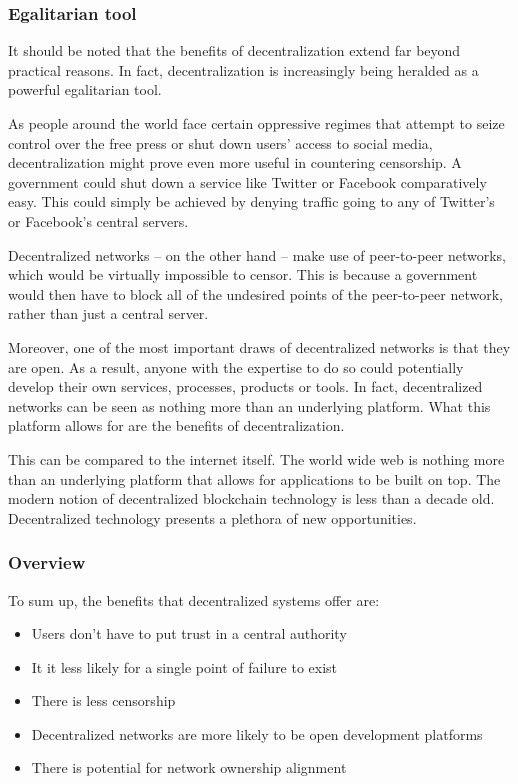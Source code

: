 \subsubsection{Egalitarian tool}
It should be noted that the benefits of decentralization extend far beyond practical reasons. In fact, decentralization is increasingly being heralded as a powerful egalitarian tool.

As people around the world face certain oppressive regimes that attempt to seize control over the free press or shut down users' access to social media, decentralization might prove even more useful in countering censorship. A government could shut down a service like Twitter or Facebook comparatively easy. This could simply be achieved by denying traffic going to any of Twitter’s or Facebook’s central servers.

Decentralized networks – on the other hand – make use of peer-to-peer networks, which would be virtually impossible to censor. This is because a government would then have to block all of the undesired points of the peer-to-peer network, rather than just a central server.

Moreover, one of the most important draws of decentralized networks is that they are open. As a result, anyone with the expertise to do so could potentially develop their own services, processes, products or tools. In fact, decentralized networks can be seen as nothing more than an underlying platform. What this platform allows for are the benefits of decentralization.

This can be compared to the internet itself. The world wide web is nothing more than an underlying platform that allows for applications to be built on top. The modern notion of decentralized blockchain technology is less than a decade old. Decentralized technology presents a plethora of new opportunities.

\subsubsection{Overview}
To sum up, the benefits that decentralized systems offer are:

\begin{itemize}
  \item Users don't have to put trust in a central authority
  \item It it less likely for a single point of failure to exist
  \item There is less censorship
  \item Decentralized networks are more likely to be open development platforms
  \item There is potential for network ownership alignment
\end{itemize}

